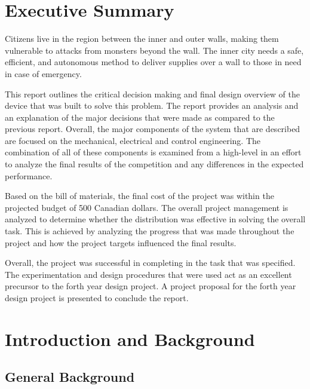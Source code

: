\documentclass[ece]{uw-wkrpt}
\let\oldsection\section
\renewcommand\section{\clearpage\oldsection}
\begin{document}
\section{Executive Summary}\label{sec:summary}
Citizens live in the region between the inner and outer walls, making them vulnerable to attacks from monsters beyond the wall. The inner city needs a safe, efficient, and autonomous method to deliver supplies over a wall to those in need in case of emergency. 

This report outlines the critical decision making and final design overview of the device that was built to solve this problem. The report provides an analysis and an explanation of the major decisions that were made as compared to the previous report. Overall, the major components of the system that are described are focused on the mechanical, electrical and control engineering. The combination of all of these components is examined from a high-level in an effort to analyze the final results of the competition and any differences in the expected performance. 

Based on the bill of materials, the final cost of the project was within the projected budget of 500 Canadian dollars. The overall project management is analyzed to determine whether the distribution was effective in solving the overall task. This is achieved by analyzing the progress that was made throughout the project and how the project targets influenced the final results.  

Overall, the project was successful in completing in the task that was specified. The experimentation and design procedures that were used act as an excellent precursor to the forth year design project. A project proposal for the forth year design project is presented to conclude the report.

\tableofcontents
\listoffigures
\listoftables



\mainmatter

% 
\section{Introduction and Background}
\subsection{General Background}
\end{document}
